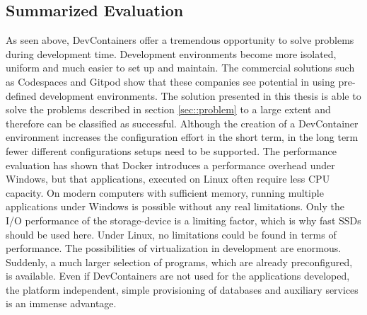     \subsection{Summarized Evaluation}
    As seen above, DevContainers offer a tremendous opportunity to solve problems during development time. Development environments become more isolated, uniform and much easier to set up and maintain. The commercial solutions such as Codespaces and Gitpod show that these companies see potential in using pre-defined development environments.\newline
    The solution presented in this thesis is able to solve the problems described in section \ref{sec::problem} to a large extent and therefore can be classified as successful. Although the creation of a DevContainer environment increases the configuration effort in the short term, in the long term fewer different configurations setups need to be supported. The performance evaluation has shown that Docker introduces a performance overhead under Windows, but that applications, executed on Linux often require less CPU capacity. On modern computers with sufficient memory, running multiple applications under Windows is possible without any real limitations. Only the I/O performance of the storage-device is a limiting factor, which is why fast SSDs should be used here. Under Linux, no limitations could be found in terms of performance. \newline
    The possibilities of virtualization in development are enormous. Suddenly, a much larger selection of programs, which are already preconfigured, is available. Even if DevContainers are not used for the applications developed, the platform independent, simple provisioning of databases and auxiliary services is an immense advantage.
